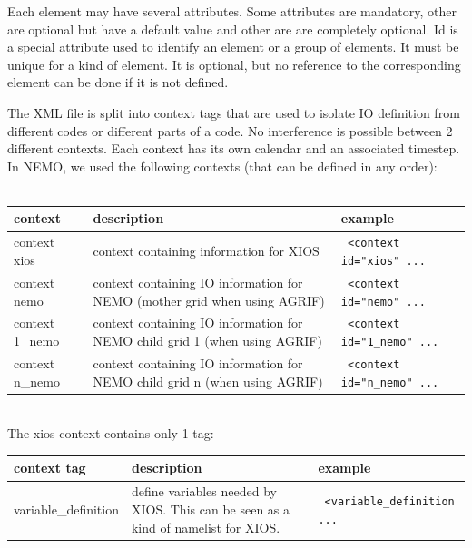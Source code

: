 Each element may have several attributes. Some attributes are mandatory, other are optional but have a default value and other are are completely optional. Id is a special attribute used to identify an element or a group of elements. It must be unique for a kind of element. It is optional, but no reference to the corresponding element can be done if it is not defined.

The XML file is split into context tags that are used to isolate IO definition from different codes or different parts of a code. No interference is possible between 2 different contexts. Each context has its own calendar and an associated timestep. In NEMO, we used the following contexts (that can be defined in any order):\\
\\
\begin{tabular}{|p{3.0cm}|p{4.5cm}|p{4.5cm}|}
   \hline
   context &
   description &
   example \\
   \hline
   \hline
   context xios &
   context containing information for XIOS &
   {\scriptsize \verb? <context id="xios" ...  ?} \\
   \hline
   context nemo &
   context containing IO information for NEMO (mother grid when using AGRIF) &
   {\scriptsize \verb? <context id="nemo" ... ?} \\
   \hline
   context 1\_nemo &
   context containing IO information for NEMO child grid 1 (when using AGRIF) &
   {\scriptsize \verb? <context id="1_nemo" ...  ?} \\
   \hline
   context n\_nemo &
   context containing IO information for NEMO child grid n (when using AGRIF) &
   {\scriptsize \verb? <context id="n_nemo" ...  ?} \\
   \hline
\end{tabular}
\\

\noindent The xios context contains only 1 tag:
\\
\begin{tabular}{|p{3.0cm}|p{4.5cm}|p{4.5cm}|}
   \hline
   context tag &
   description &
   example \\
   \hline
   \hline
   variable\_definition &
   define variables needed by XIOS. This can be seen as a kind of namelist for XIOS. &
   {\scriptsize \verb? <variable_definition ... ?} \\
   \hline
\end{tabular}
\\

